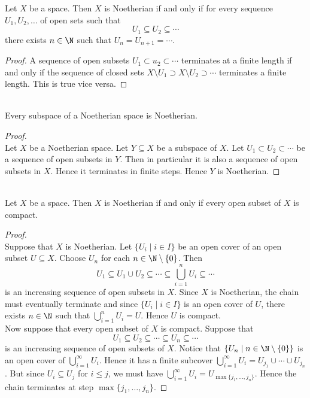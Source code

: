 \documentclass[a4paper]{article}
\begin{document}
\begin{prp}{}{} Let $X$ be a space. Then $X$ is Noetherian if and only if for every sequence $U_1,U_2,\dots$ of open sets such that $$U_1\subseteq U_2\subseteq\cdots$$ there exists $n\in\N$ such that $U_n=U_{n+1}=\cdots$. 
\begin{proof}
A sequence of open subsets $U_1\subset u_2\subset\cdots$ terminates at a finite length if and only if the sequence of closed sets $X\setminus U_1\supset X\setminus U_2\supset\cdots$ terminates a finite length. This is true vice versa. 
\end{proof}
\end{prp}

\begin{prp}{}{}\\
Every subspace of a Noetherian space is Noetherian. 
\begin{proof}\\
Let $X$ be a Noetherian space. Let $Y\subseteq X$ be a subspace of $X$. Let $U_1\subset U_2\subset\cdots$ be a sequence of open subsets in $Y$. Then in particular it is also a sequence of open subsets in $X$. Hence it terminates in finite steps. Hence $Y$ is Noetherian. 
\end{proof}
\end{prp}

\begin{prp}{}{}\\
Let $X$ be a space. Then $X$ is Noetherian if and only if every open subset of $X$ is compact. 
\begin{proof}\\
Suppose that $X$ is Noetherian. Let $\{U_i\;|\;i\in I\}$ be an open cover of an open subset $U\subseteq X$. Choose $U_n$ for each $n\in\N\setminus\{0\}$. Then $$U_1\subseteq U_1\cup U_2\subseteq\cdots\subseteq\bigcup_{i=1}^nU_i\subseteq\cdots$$ is an increasing sequence of open subsets in $X$. Since $X$ is Noetherian, the chain must eventually terminate and since $\{U_i\;|\;i\in I\}$ is an open cover of $U$, there exists $n\in\N$ such that $\bigcup_{i=1}^nU_i=U$. Hence $U$ is compact. \\

Now suppose that every open subset of $X$ is compact. Suppose that $$U_1\subseteq U_2\subseteq\cdots\subseteq U_n\subseteq\cdots$$ is an increasing sequence of open subsets of $X$. Notice that $\{U_n\;|\;n\in\N\setminus\{0\}\}$ is an open cover of $\bigcup_{i=1}^\infty U_i$. Hence it has a finite subcover $\bigcup_{i=1}^\infty U_i=U_{j_1}\cup\cdots\cup U_{j_n}$. But since $U_i\subseteq U_j$ for $i\leq j$, we must have $\bigcup_{i=1}^\infty U_i=U_{\max\{j_1,\dots,j_n\}}$. Hence the chain terminates at step $\max\{j_1,\dots,j_n\}$. 
\end{proof}
\end{prp}
\end{document}
